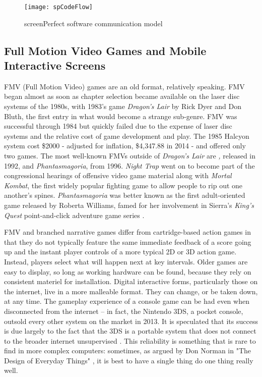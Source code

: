 \clearpage
\begin{figure}[h!]
 \centering
 \texttt{[image: spCodeFlow]}
 \caption{screenPerfect software communication model}
\end{figure}
\clearpage

\subsection{Full Motion Video Games and Mobile Interactive Screens}
FMV (Full Motion Video) games are an old format, relatively speaking. FMV began almost as soon as chapter selection became available on the laser disc systems of the 1980s, with 1983's game \textit{Dragon's Lair} by Rick Dyer and Don Bluth, the first entry in what would become a strange sub-genre. FMV was successful through 1984 but quickly failed due to the expense of laser disc systems and the relative cost of game development and play. The 1985 Halcyon system cost \$2000 - adjusted for inflation, \$4,347.88 in 2014 - and offered only two games. The most well-known FMVs outside of \textit{Dragon's Lair} are \textit\textit, released in 1992, and \textit{Phantasmagoria}, from 1996. \textit{Night Trap} went on to become part of the congressional hearings of offensive video game material along with \textit{Mortal Kombat}, the first widely popular fighting game to allow people to rip out one another's spines. \textit{Phantasmagoria} was better known as the first adult-oriented game released by Roberta Williams, famed for her involvement in Sierra's \textit{King's Quest} point-and-click adventure game series \parencite{encyclopediavideogame}.

FMV and branched narrative games differ from cartridge-based action games in that they do not typically feature the same immediate feedback of a score going up and the instant player controls of a more typical 2D or 3D action game. Instead, players select what will happen next at key intervals. Older games are easy to display, so long as working hardware can be found, because they rely on consistent materiel for installation. Digital interactive forms, particularly those on the internet, live in a more malleable format. They can change, or be taken down, at any time. The gameplay experience of a console game can be had even when disconnected from the internet – in fact, the Nintendo 3DS, a pocket console, outsold every other system on the market in 2013. It is speculated that its success is due largely to the fact that the 3DS is a portable system that does not connect to the broader internet unsupervised \parencite{3dssales}. This reliability is something that is rare to find in more complex computers: sometimes, as argued by Don Norman in "The Design of Everyday Things" \parencite{norman}, it is best to have a single thing do one thing really well. 

